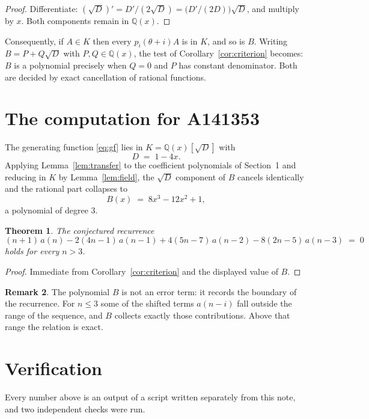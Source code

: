 \documentclass[11pt,a4paper]{article}
\theoremstyle{plain}
\newtheorem{theorem}{Theorem}
\theoremstyle{definition}
\newtheorem{remark}[theorem]{Remark}
\begin{document}
\begin{proof}
Differentiate: $(\sqrt{D})'=D'/(2\sqrt{D})=\bigl(D'/(2D)\bigr)\sqrt{D}$, and multiply by
$x$. Both components remain in $\mathbb{Q}(x)$.
\end{proof}

Consequently, if $A\in K$ then every $p_{i}(\theta+i)A$ is in $K$, and so is $B$. Writing
$B=P+Q\sqrt{D}$ with $P,Q\in\mathbb{Q}(x)$, the test of Corollary~\ref{cor:criterion}
becomes: $B$ is a polynomial precisely when $Q=0$ and $P$ has constant denominator. Both
are decided by exact cancellation of rational functions.

\section{The computation for A141353}

The generating function \eqref{eq:gf} lies in $K=\mathbb{Q}(x)[\sqrt{D}]$ with
\[
D \;=\; 1 - 4 x .
\]
Applying Lemma~\ref{lem:transfer} to the coefficient polynomials of Section~1 and reducing
in $K$ by Lemma~\ref{lem:field}, the $\sqrt{D}$ component of $B$ cancels identically and
the rational part collapses to
\[
B(x)\;=\;8 x^{3} - 12 x^{2} + 1 ,
\]
a polynomial of degree $3$.

\begin{theorem}
The conjectured recurrence
\[
(n + 1)\,a(n) -  2 \left(4 n - 1\right)\,a(n-1) + 4 \left(5 n - 7\right)\,a(n-2) -  8 \left(2 n - 5\right)\,a(n-3) \;=\;0
\]
holds for every $n>3$.
\end{theorem}

\begin{proof}
Immediate from Corollary~\ref{cor:criterion} and the displayed value of $B$.
\end{proof}

\begin{remark}
The polynomial $B$ is not an error term: it records the boundary of the recurrence. For
$n\le3$ some of the shifted terms $a(n-i)$ fall outside the range of the sequence,
and $B$ collects exactly those contributions. Above that range the relation is exact.
\end{remark}

\section{Verification}

Every number above is an output of a script written separately from this note, and two
independent checks were run.
\end{document}
